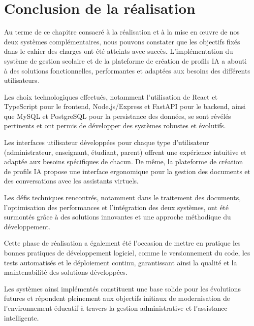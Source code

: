 \section{Conclusion de la réalisation}

Au terme de ce chapitre consacré à la réalisation et à la mise en œuvre de nos deux systèmes complémentaires, nous pouvons constater que les objectifs fixés dans le cahier des charges ont été atteints avec succès. L'implémentation du système de gestion scolaire et de la plateforme de création de profils IA a abouti à des solutions fonctionnelles, performantes et adaptées aux besoins des différents utilisateurs.

Les choix technologiques effectués, notamment l'utilisation de React et TypeScript pour le frontend, Node.js/Express et FastAPI pour le backend, ainsi que MySQL et PostgreSQL pour la persistance des données, se sont révélés pertinents et ont permis de développer des systèmes robustes et évolutifs.

Les interfaces utilisateur développées pour chaque type d'utilisateur (administrateur, enseignant, étudiant, parent) offrent une expérience intuitive et adaptée aux besoins spécifiques de chacun. De même, la plateforme de création de profils IA propose une interface ergonomique pour la gestion des documents et des conversations avec les assistants virtuels.

Les défis techniques rencontrés, notamment dans le traitement des documents, l'optimisation des performances et l'intégration des deux systèmes, ont été surmontés grâce à des solutions innovantes et une approche méthodique du développement.

Cette phase de réalisation a également été l'occasion de mettre en pratique les bonnes pratiques de développement logiciel, comme le versionnement du code, les tests automatisés et le déploiement continu, garantissant ainsi la qualité et la maintenabilité des solutions développées.

Les systèmes ainsi implémentés constituent une base solide pour les évolutions futures et répondent pleinement aux objectifs initiaux de modernisation de l'environnement éducatif à travers la gestion administrative et l'assistance intelligente.

